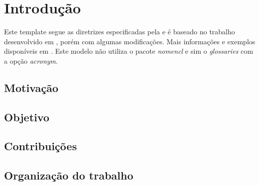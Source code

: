 \chapter[Introdução]{Introdução}
Este template segue as diretrizes especificadas pela  e é baseado no trabalho desenvolvido em \cite{manual_abntex2}, porém com algumas modificações. Mais informações e exemplos disponíveis em \cite{site_abntex2}. Este modelo não utiliza o pacote \textit{nomencl} e sim o \textit{glossaries} com a opção \textit{acronym}.

\section{Motivação}
\lipsum[100]

\section{Objetivo}
\lipsum[100]

\section{Contribuições}

\section{Organização do trabalho}